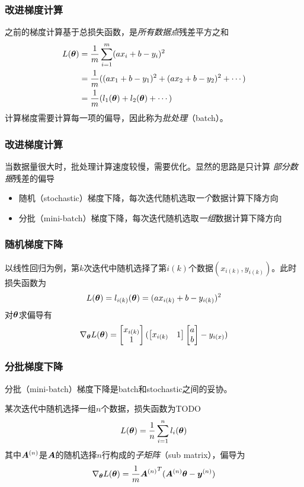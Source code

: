 \documentclass[14pt]{beamer}
\begin{document}
\begin{frame}
  \frametitle{改进梯度计算}
  之前的梯度计算基于总损失函数，是\emph{所有数据点}残差平方之和
  \begin{equation*}
    \begin{split}
    L(\bm{\theta})&=\frac{1}{m}\sum_{i=1}^{m}(ax_i+b-y_i)^2\\
    &=\frac{1}{m}((ax_1+b-y_1)^2+(ax_2+b-y_2)^2+\cdots)\\
    &=\frac{1}{m}(l_1(\bm{\theta})+l_2(\bm{\theta})+\cdots)
    \end{split}
  \end{equation*}
  计算梯度需要计算每一项的偏导，因此称为\emph{批处理}（batch）。
\end{frame}

\begin{frame}
  \frametitle{改进梯度计算} 
  当数据量很大时，批处理计算速度较慢，需要优化。显然的思路是只计算
  \emph{部分数据}残差的偏导
  \begin{itemize}
    \item 随机（stochastic）梯度下降，每次迭代随机选取\emph{一个}数据计算下降方向
    \item 分批（mini-batch）梯度下降，每次迭代随机选取\emph{一组}数据计算下降方向
  \end{itemize}
\end{frame}

\begin{frame}
  \frametitle{随机梯度下降}
  以线性回归为例，第$k$次迭代中随机选择了第$i(k)$个数据$(x_{i(k)}, y_{i(k)})$。此时损失函数为
  \begin{equation}
    L(\bm{\theta})=l_{i(k)}(\bm{\theta})=(ax_{i(k)}+b-y_{i(k)})^2
  \end{equation}
  对$\bm{\theta}$求偏导有
  \begin{equation}
      \nabla_{\bm{\theta}}L(\bm{\theta}) =\begin{bmatrix}
        x_{i(k)}\\
        1
      \end{bmatrix}(\begin{bmatrix}
        x_{i(k)} & 1
      \end{bmatrix}\begin{bmatrix}
        a\\
        b
      \end{bmatrix}-y_{i(x)})
  \end{equation}
\end{frame}

\begin{frame}
  \frametitle{分批梯度下降}
  分批（mini-batch）梯度下降是batch和stochastic之间的妥协。
  
  某次迭代中随机选择一组$n$个数据，损失函数为TODO
  \begin{equation}
    L(\bm{\theta})=\frac{1}{n}\sum_{i=1}^{n}l_i(\bm{\theta})
  \end{equation}
  其中$\bm{A}^{(n)}$是$\bm{A}$的随机选择$n$行构成的\emph{子矩阵}（sub matrix），偏导为
  \begin{equation}
      \nabla_{\bm{\theta}}L(\bm{\theta})= \frac{1}{m}\bm{A}{^{(n)}}^T(\bm{A}^{(n)}\bm{\theta}-\bm{y}^{(n)})
  \end{equation}
\end{frame}
\end{document}
